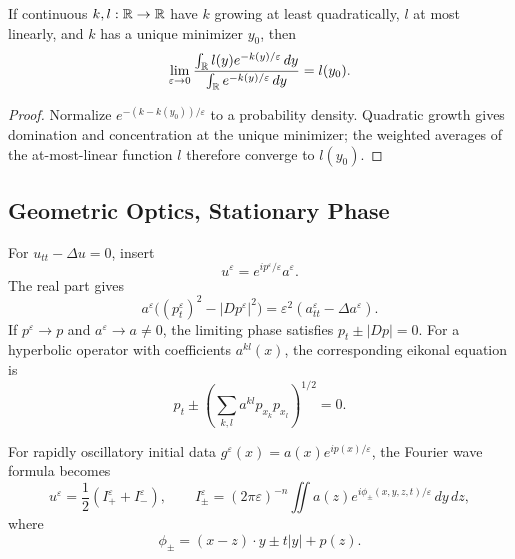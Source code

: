 \begin{lemma}
\label{lem:laplace-method-asymptotics-lemma}
If continuous $k,l:\mathbb{R}\to\mathbb{R}$ have $k$ growing at least quadratically,
$l$ at most linearly, and $k$ has a unique minimizer $y_0$, then
\[
\lim_{\varepsilon\to0}
\frac{\int_{\mathbb{R}} l(y)e^{-k(y)/\varepsilon}\,dy}
{\int_{\mathbb{R}} e^{-k(y)/\varepsilon}\,dy}=l(y_0).
\]
\end{lemma}

\begin{proof}
\sketch Normalize $e^{-(k-k(y_0))/\varepsilon}$ to a probability density.
Quadratic growth gives domination and concentration at the unique minimizer;
the weighted averages of the at-most-linear function $l$ therefore converge to
$l(y_0)$.
\end{proof}

\subsection{Geometric Optics, Stationary Phase}
\label{sec:geometric-optics-stationary-phase}

\begin{example}
\label{ex:geometric-optics-oscillating-solutions}

For $u_{tt}-\Delta u=0$, insert
\[
u^\varepsilon=e^{ip^\varepsilon/\varepsilon}a^\varepsilon.
\]
The real part gives
\[
a^\varepsilon\big((p_t^\varepsilon)^2-|Dp^\varepsilon|^2\big)
=\varepsilon^2(a_{tt}^\varepsilon-\Delta a^\varepsilon).
\]
If $p^\varepsilon\to p$ and $a^\varepsilon\to a\ne0$, the limiting phase
satisfies $p_t\pm|Dp|=0$. For a hyperbolic operator with coefficients
$a^{kl}(x)$, the corresponding eikonal equation is
\[
p_t\pm\left(\sum_{k,l}a^{kl}p_{x_k}p_{x_l}\right)^{1/2}=0.
\]
\end{example}

\begin{example}
\label{ex:stationary-phase-wave-equation}

For rapidly oscillatory initial data $g^\varepsilon(x)=a(x)e^{ip(x)/\varepsilon}$,
the Fourier wave formula becomes
\[
u^\varepsilon=\frac12(I_+^\varepsilon+I_-^\varepsilon),\qquad
I_\pm^\varepsilon=(2\pi\varepsilon)^{-n}
\iint a(z)e^{i\phi_\pm(x,y,z,t)/\varepsilon}\,dy\,dz,
\]
where
\[
\phi_\pm=(x-z)\cdot y\pm t|y|+p(z).
\]
\end{example}

